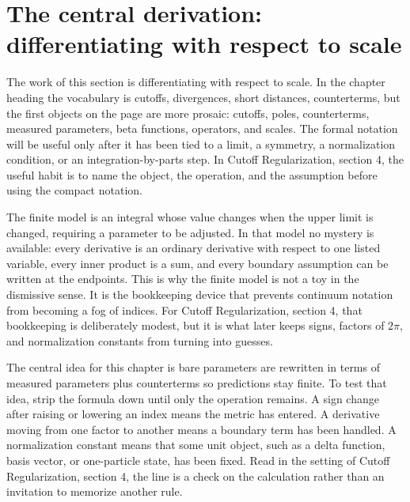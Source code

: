 \section{The central derivation: differentiating with respect to scale}













The work of this section is differentiating with respect to scale.  In the chapter heading the vocabulary is cutoffs, divergences, short distances, counterterms, but the first objects on the page are more prosaic: cutoffs, poles, counterterms, measured parameters, beta functions, operators, and scales.  The formal notation will be useful only after it has been tied to a limit, a symmetry, a normalization condition, or an integration-by-parts step.  In Cutoff Regularization, section 4, the useful habit is to name the object, the operation, and the assumption before using the compact notation.

The finite model is an integral whose value changes when the upper limit is changed, requiring a parameter to be adjusted.  In that model no mystery is available: every derivative is an ordinary derivative with respect to one listed variable, every inner product is a sum, and every boundary assumption can be written at the endpoints.  This is why the finite model is not a toy in the dismissive sense.  It is the bookkeeping device that prevents continuum notation from becoming a fog of indices.  For Cutoff Regularization, section 4, that bookkeeping is deliberately modest, but it is what later keeps signs, factors of \(2\pi\), and normalization constants from turning into guesses.

The central idea for this chapter is bare parameters are rewritten in terms of measured parameters plus counterterms so predictions stay finite.  To test that idea, strip the formula down until only the operation remains.  A sign change after raising or lowering an index means the metric has entered.  A derivative moving from one factor to another means a boundary term has been handled.  A normalization constant means that some unit object, such as a delta function, basis vector, or one-particle state, has been fixed.  Read in the setting of Cutoff Regularization, section 4, the line is a check on the calculation rather than an invitation to memorize another rule.

